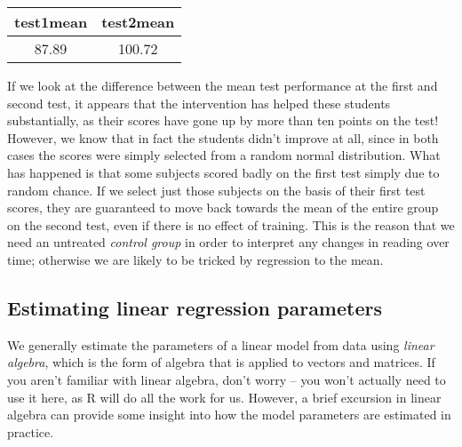 \documentclass[]{book}
\theoremstyle{definition}
\theoremstyle{definition}
\theoremstyle{definition}
\theoremstyle{remark}
\begin{document}
\begin{longtable}[]{@{}cc@{}}
\toprule
\begin{minipage}[b]{0.16\columnwidth}\centering\strut
test1mean\strut
\end{minipage} & \begin{minipage}[b]{0.16\columnwidth}\centering\strut
test2mean\strut
\end{minipage}\tabularnewline
\midrule
\endhead
\begin{minipage}[t]{0.16\columnwidth}\centering\strut
87.89\strut
\end{minipage} & \begin{minipage}[t]{0.16\columnwidth}\centering\strut
100.72\strut
\end{minipage}\tabularnewline
\bottomrule
\end{longtable}

If we look at the difference between the mean test performance at the
first and second test, it appears that the intervention has helped these
students substantially, as their scores have gone up by more than ten
points on the test! However, we know that in fact the students didn't
improve at all, since in both cases the scores were simply selected from
a random normal distribution. What has happened is that some subjects
scored badly on the first test simply due to random chance. If we select
just those subjects on the basis of their first test scores, they are
guaranteed to move back towards the mean of the entire group on the
second test, even if there is no effect of training. This is the reason
that we need an untreated \emph{control group} in order to interpret any
changes in reading over time; otherwise we are likely to be tricked by
regression to the mean.

\subsection{Estimating linear regression
parameters}\label{estimating-linear-regression-parameters}

We generally estimate the parameters of a linear model from data using
\emph{linear algebra}, which is the form of algebra that is applied to
vectors and matrices. If you aren't familiar with linear algebra, don't
worry -- you won't actually need to use it here, as R will do all the
work for us. However, a brief excursion in linear algebra can provide
some insight into how the model parameters are estimated in practice.
\end{document}
